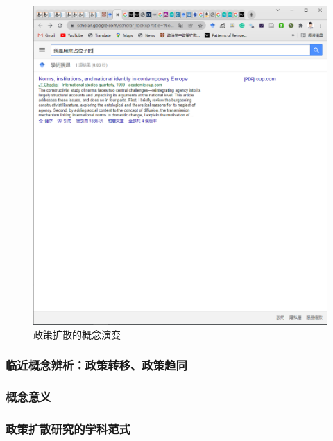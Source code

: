 \documentclass[
  12pt,
]{ctexart}
\begin{document}
\begin{figure}
\includegraphics[width=1\linewidth]{../figures/政策扩散的概念演变} \caption{政策扩散的概念演变}\label{fig:unnamed-chunk-3}
\end{figure}

\hypertarget{ux4e34ux8fd1ux6982ux5ff5ux8fa8ux6790ux653fux7b56ux8f6cux79fbux653fux7b56ux8d8bux540c}{%
\subsubsection{临近概念辨析：政策转移、政策趋同}\label{ux4e34ux8fd1ux6982ux5ff5ux8fa8ux6790ux653fux7b56ux8f6cux79fbux653fux7b56ux8d8bux540c}}

\hypertarget{ux6982ux5ff5ux610fux4e49}{%
\subsubsection{概念意义}\label{ux6982ux5ff5ux610fux4e49}}

\hypertarget{ux653fux7b56ux6269ux6563ux7814ux7a76ux7684ux5b66ux79d1ux8303ux5f0f}{%
\subsubsection{政策扩散研究的学科范式}\label{ux653fux7b56ux6269ux6563ux7814ux7a76ux7684ux5b66ux79d1ux8303ux5f0f}}
\end{document}
